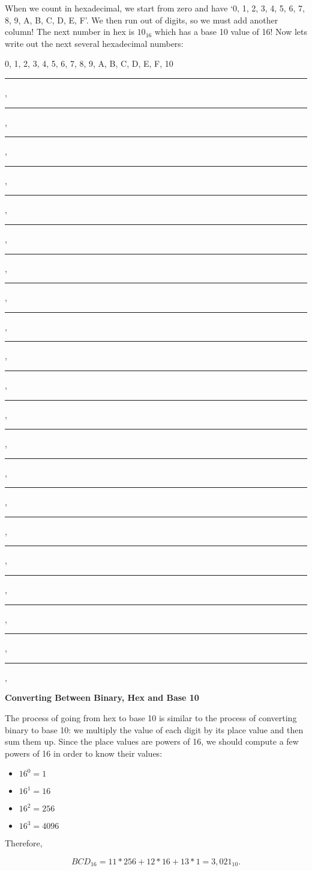 \documentclass{article}
\begin{document}
When we count in hexadecimal, we start from zero and have `0, 1, 2, 3, 4, 5, 6, 7, 8, 9, A, B, C, D, E, F'.  We then run out of digits, so we must add another column! The next number in hex is $10_{16}$ which has a base 10 value of 16! Now lets write out the next several hexadecimal numbers:

\vspace{0.3in}

0, 1, 2, 3, 4, 5, 6, 7, 8, 9, A, B, C, D, E, F, 10 \rule{1in}{.01in}, \rule{1in}{.01in},  \rule{1in}{.01in},  \newline

\vspace{0.3in}

\rule{1in}{.01in}, \rule{1in}{.01in},  \rule{1in}{.01in},  \rule{1in}{.01in}, \rule{1in}{.01in},  \rule{1in}{.01in},\newline

\vspace{0.3in}

\rule{1in}{.01in}, \rule{1in}{.01in},  \rule{1in}{.01in},  \rule{1in}{.01in}, \rule{1in}{.01in},  \rule{1in}{.01in},\newline

\vspace{0.3in}

\rule{1in}{.01in}, \rule{1in}{.01in},  \rule{1in}{.01in},  \rule{1in}{.01in}, \rule{1in}{.01in},  \rule{1in}{.01in},\newline

\newpage

  
\noindent\textbf{Converting Between Binary, Hex and Base 10}

\vspace{0.3in}

The process of going from hex to base 10 is similar to the process of converting binary to base 10: we multiply the value of each digit by its place value and then sum them up. Since the place values are powers of 16, we should compute a few powers of 16 in order to know their values:
\begin{itemize}
\item[] $16^0=1$
\item[] $16^1=16$
\item[] $16^2=256$
\item[] $16^3=4096$
\end{itemize}

Therefore, 

\[BCD_{16} = 11*256 + 12*16 + 13*1 = 3,021_{10}.\]
\end{document}
